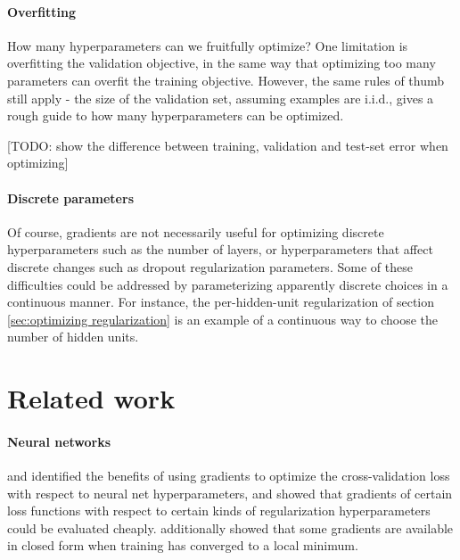 \documentclass{article}
\begin{document}
\paragraph{Overfitting}
How many hyperparameters can we fruitfully optimize?
One limitation is overfitting the validation objective, in the same way that optimizing too many parameters can overfit the training objective.
However, the same rules of thumb still apply - the size of the validation set, assuming examples are i.i.d., gives a rough guide to how many hyperparameters can be optimized.

[TODO: show the difference between training, validation and test-set error when optimizing]


\paragraph{Discrete parameters}
Of course, gradients are not necessarily useful for optimizing discrete hyperparameters such as the number of layers, or hyperparameters that affect discrete changes such as dropout regularization parameters.
Some of these difficulties could be addressed by parameterizing apparently discrete choices in a continuous manner.
For instance, the per-hidden-unit regularization of section \ref{sec:optimizing regularization} is an example of a continuous way to choose the number of hidden units.




\section{Related work}


\paragraph{Neural networks}
\citet{larsen1998adaptive} and \citet{bengio2000gradient} identified the benefits of using gradients to optimize the cross-validation loss with respect to neural net hyperparameters, and showed that gradients of certain loss functions with respect to certain kinds of regularization hyperparameters could be evaluated cheaply.
\citet{bengio2000gradient} additionally showed that some gradients are available in closed form when training has converged to a local minimum.
\end{document}
